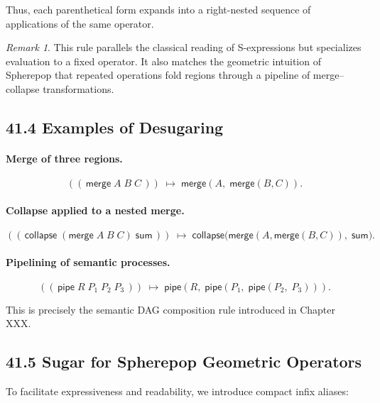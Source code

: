 \documentclass[12pt,letterpaper]{article}
\theoremstyle{remark}
\newtheorem{remark}[theorem]{Remark}
\begin{document}
Thus, each parenthetical form expands into a right-nested sequence of applications of the same operator.

\begin{remark}
This rule parallels the classical reading of S-expressions but specializes evaluation to a fixed operator. It also matches the geometric intuition of Spherepop that repeated operations fold regions through a pipeline of merge--collapse transformations.
\end{remark}

\subsection{41.4 Examples of Desugaring}

\paragraph{Merge of three regions.}
\[
((\,\mathsf{merge}\; A\; B\; C\,))
\;\mapsto\;
\mathsf{merge}(A,\; \mathsf{merge}(B, C)).
\]

\paragraph{Collapse applied to a nested merge.}
\[
((\,\mathsf{collapse}\; (\mathsf{merge}\; A\; B\; C)\; \mathsf{sum}\,))
\;\mapsto\;
\mathsf{collapse}\big(\mathsf{merge}(A,\mathsf{merge}(B,C)),\; \mathsf{sum}\big).
\]

\paragraph{Pipelining of semantic processes.}
\[
((\,\mathsf{pipe}\; R\; P_1\; P_2\; P_3\,))
\;\mapsto\;
\mathsf{pipe}(R,\; \mathsf{pipe}(P_1,\; \mathsf{pipe}(P_2,\; P_3))).
\]

This is precisely the semantic DAG composition rule introduced in Chapter XXX.

\subsection{41.5 Sugar for Spherepop Geometric Operators}

To facilitate expressiveness and readability, we introduce compact infix aliases:
\end{document}
